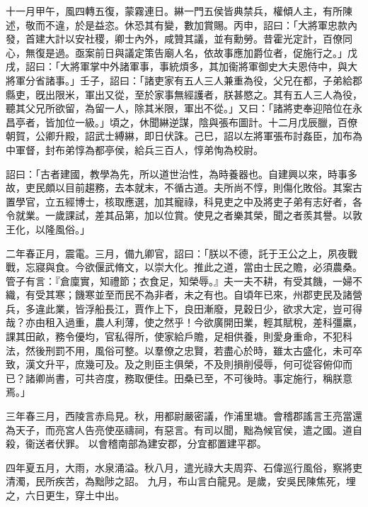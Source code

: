 \begin{pinyinscope}
 
 
 
 十一月甲午，風四轉五復，蒙霧連日。綝一門五侯皆典禁兵，權傾人主，有所陳述，敬而不違，於是益恣。休恐其有變，數加賞賜。丙申，詔曰：「大將軍忠款內發，首建大計以安社稷，卿士內外，咸贊其議，並有勳勞。昔霍光定計，百僚同心，無復是過。亟案前日與議定策告廟人名，依故事應加爵位者，促施行之。」戊戌，詔曰：「大將軍掌中外諸軍事，事統煩多，其加衞將軍御史大夫恩侍中，與大將軍分省諸事。」壬子，詔曰：「諸吏家有五人三人兼重為役，父兄在都，子弟給郡縣吏，旣出限米，軍出又從，至於家事無經護者，朕甚愍之。其有五人三人為役，聽其父兄所欲留，為留一人，除其米限，軍出不從。」又曰：「諸將吏奉迎陪位在永昌亭者，皆加位一級。」頃之，休聞綝逆謀，陰與張布圖計。十二月戊辰臘，百僚朝賀，公卿升殿，詔武士縛綝，即日伏誅。己巳，詔以左將軍張布討姦臣，加布為中軍督，封布弟惇為都亭侯，給兵三百人，惇弟恂為校尉。
 
 
 
 
 詔曰：「古者建國，教學為先，所以道世治性，為時養器也。自建興以來，時事多故，吏民頗以目前趨務，去本就末，不循古道。夫所尚不惇，則傷化敗俗。其案古置學官，立五經博士，核取應選，加其寵祿，科見吏之中及將吏子弟有志好者，各令就業。一歲課試，差其品第，加以位賞。使見之者樂其榮，聞之者羨其譽。以敦王化，以隆風俗。」
 
 
 
 
 二年春正月，震電。三月，備九卿官，詔曰：「朕以不德，託于王公之上，夙夜戰戰，忘寢與食。今欲偃武脩文，以崇大化。推此之道，當由士民之贍，必須農桑。管子有言：『倉廩實，知禮節；衣食足，知榮辱。』夫一夫不耕，有受其饑，一婦不織，有受其寒；饑寒並至而民不為非者，未之有也。自頃年已來，州郡吏民及諸營兵，多違此業，皆浮船長江，賈作上下，良田漸廢，見穀日少，欲求大定，豈可得哉？亦由租入過重，農人利薄，使之然乎！今欲廣開田業，輕其賦稅，差科彊羸，課其田畝，務令優均，官私得所，使家給戶贍，足相供養，則愛身重命，不犯科法，然後刑罰不用，風俗可整。以羣僚之忠賢，若盡心於時，雖太古盛化，未可卒致，漢文升平，庶幾可及。及之則臣主俱榮，不及則損削侵辱，何可從容俯仰而已？諸卿尚書，可共咨度，務取便佳。田桑已至，不可後時。事定施行，稱朕意焉。」
 
 
三年春三月，西陵言赤烏見。秋，用都尉嚴密議，作浦里塘。會稽郡謠言王亮當還為天子，而亮宮人告亮使巫禱祠，有惡言。有司以聞，黜為候官侯，遣之國。道自殺，衞送者伏罪。
 以會稽南部為建安郡，分宜都置建平郡。
 
 
四年夏五月，大雨，水泉涌溢。秋八月，遣光祿大夫周弈、石偉巡行風俗，察將吏清濁，民所疾苦，為黜陟之詔。
 九月，布山言白龍見。是歲，安吳民陳焦死，埋之，六日更生，穿土中出。
 

\end{pinyinscope}

